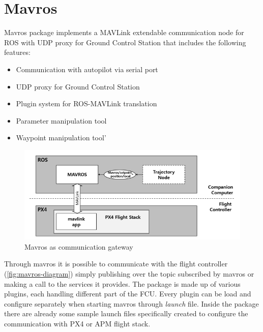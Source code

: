 
\chapter{Mavros} %
\label{appendix:mavros}
Mavros package implements a MAVLink extendable communication node for ROS with UDP proxy for Ground Control Station that includes the following features:
\begin{itemize}
	\item Communication with autopilot via serial port
	\item UDP proxy for Ground Control Station
	\item Plugin system for ROS-MAVLink translation
	\item Parameter manipulation tool
	\item Waypoint manipulation tool'
\end{itemize}

 \begin{figure}[ht]
    \centering
    \includegraphics[width=.7\textwidth]{figures/A4/diagram.png}
    \caption{Mavros as communication gateway}
    \label{fig:mavros-diagram}
\end{figure}
Through mavros it is possible to communicate with the flight controller (\autoref{fig:mavros-diagram}) simply publishing over the topic subscribed by mavros or making a call to the services it provides.
The package is made up of various plugins, each handling different part  of the FCU.
Every plugin can be load and configure separately when starting mavros through \textit{launch} file. Inside the package there are already some sample launch files specifically created to configure the communication with PX4 or APM flight stack.

